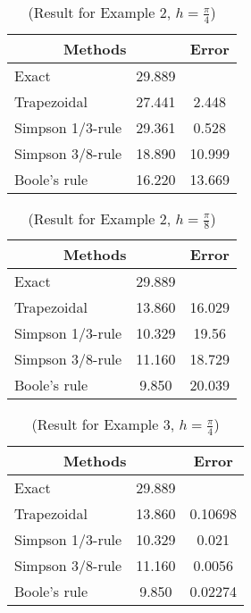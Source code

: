 \documentclass[12pt]{report}
\newcommand{\spn}[1]{\\[#1cm]}
\newcommand{\dsp}{\displaystyle}
\begin{document}
	\begin{table}[!hbt]
		\begin{center}
			\begin{tabular}{|l|c|c|}
				\hline
				\multicolumn{2}{|c|}{Methods}& Error\\ \hline
				Exact & 29.889& \\ \hline
				Trapezoidal & 27.441 & 2.448 \\ \hline
				Simpson 1/3-rule & 29.361 & 0.528 \\ \hline
				Simpson 3/8-rule & 18.890 & 10.999 \\ \hline
				Boole's rule & 16.220 & 13.669\\ \hline
			\end{tabular}
		\end{center}
		\caption{(Result for Example 2, $\dsp h=\frac{\pi}{4}$)}
		\label{tb:4_2}
	\end{table}
	\begin{table}[!hbt]
		\begin{center}
			\begin{tabular}{|l|c|c|}
				\hline
				\multicolumn{2}{|c|}{Methods}& Error\\ \hline
				Exact & 29.889 &  \\ \hline
				Trapezoidal & 13.860 & 16.029 \\ \hline
				Simpson 1/3-rule & 10.329 & 19.56 \\ \hline
				Simpson 3/8-rule & 11.160 & 18.729 \\ \hline
				Boole's rule & 9.850 & 20.039\\ \hline
			\end{tabular}
		\end{center}
		\caption{(Result for Example 2, $\dsp h=\frac{\pi}{8}$)}
		\label{tb:4_3}
	\end{table}
	\begin{table}[h]
		\begin{center}
			\begin{tabular}{|l|c|c|}
				\hline
				\multicolumn{2}{|c|}{Methods}& Error\\ \hline
				Exact & 29.889 &  \\ \hline
				Trapezoidal & 13.860 & 0.10698 \\ \hline
				Simpson 1/3-rule & 10.329 & 0.021 \\ \hline
				Simpson 3/8-rule & 11.160 & 0.0056 \\ \hline
				Boole's rule & 9.850 & 0.02274\\ \hline
			\end{tabular}
		\end{center}
		\caption{(Result for Example 3, $\dsp h=\frac{\pi}{4}$)}
		\label{tb:4_4}
	\end{table}
	\newpage
	$\left.\right.$\spn{0.8}
\end{document}

